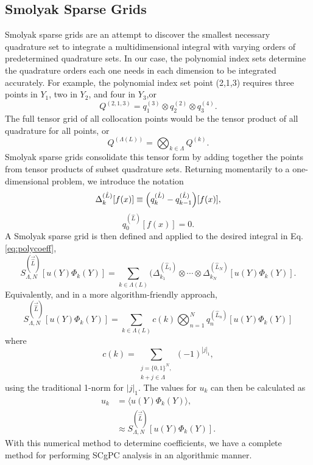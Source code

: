 \subsection{Smolyak Sparse Grids}
Smolyak sparse grids\cite{smolyak} are an attempt to discover the smallest necessary quadrature set to
integrate a multidimensional integral with varying orders of predetermined quadrature sets.  In our case, the
polynomial index sets determine the quadrature orders each one needs in each dimension to be integrated
accurately.  For example, the polynomial index set point (2,1,3) requires three points in $Y_1$, two in $Y_2$,
and four in $Y_3$,or
\begin{equation}
  Q^{(2,1,3)} = q^{(3)}_1 \otimes q^{(2)}_2 \otimes q^{(4)}_3.
\end{equation}
The full tensor grid of all collocation points would be the tensor product of all quadrature for all points,
or
\begin{equation}
  Q^{(\Lambda(L))} = \bigotimes_{k\in\Lambda}Q^{(k)}.
\end{equation}
Smolyak sparse grids consolidate this tensor form by adding together the points from tensor products of subset
quadrature sets.  Returning momentarily to a one-dimensional problem, we introduce the notation
\begin{equation}
  \Delta_k^{(\hat L)}[f(x)] \equiv \qty(q_k^{(\hat L)} - q_{k-1}^{(\hat L)})[f(x)],
\end{equation}
\begin{equation}
  q_0^{(\hat L)}[f(x)] = 0.
\end{equation}
A Smolyak sparse grid is then defined and applied to the desired integral in Eq. \ref{eq:polycoeff},
\begin{equation}
  S^{(\vec{\hat L})}_{\Lambda,N}[u(Y)\Phi_k(Y)] = \sum_{k\in\Lambda(L)} (\Delta_{k_1}^{(\hat L_1)} \otimes \cdots \otimes
  \Delta_{k_N}^{(\hat L_N)}[u(Y)\Phi_k(Y)].
\end{equation}
Equivalently, and in a more algorithm-friendly approach,
\begin{equation}
  S^{(\vec{\hat L})}_{\Lambda,N}[u(Y)\Phi_k(Y)] = \sum_{k\in\Lambda(L)} c(k)\bigotimes_{n=1}^N
  q^{(\hat L_n)}_n[u(Y)\Phi_k(Y)]
\end{equation}
where
\begin{equation}
  c(k) = \sum_{\substack{j=\{0,1\}^N,\\k+j\in\Lambda}} (-1)^{|j|_1},
\end{equation}
using the traditional 1-norm for $|j|_1$.
The values for $u_k$ can then be calculated as
\begin{align}
  u_k &= \langle u(Y)\Phi_k(Y) \rangle,\\
      &\approx S^{(\vec{\hat L})}_{\Lambda,N}[u(Y)\Phi_k(Y)].
\end{align}
With this numerical method to determine coefficients, we have a complete method for performing SCgPC
analysis in an algorithmic manner.




